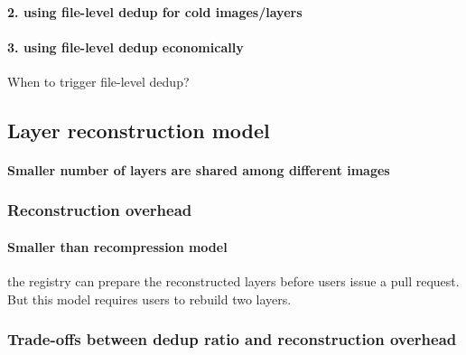 \paragraph{2. using file-level dedup for cold images/layers}
\paragraph{3. using file-level dedup economically}
When to trigger file-level dedup?


\subsection{Layer reconstruction model}

\paragraph{Smaller number of layers are shared among different images}


\subsubsection{Reconstruction overhead}

\paragraph{Smaller than recompression model} the registry can prepare the reconstructed layers before users issue a pull request. But this model requires users to rebuild two layers.

\subsubsection{Trade-offs between dedup ratio and reconstruction overhead}



